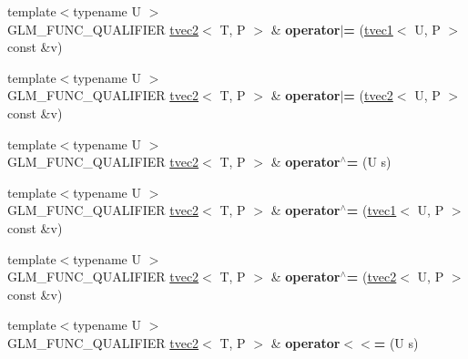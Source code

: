 \begin{DoxyCompactItemize}
\item 
\hypertarget{structglm_1_1tvec2_a843e403f0c04d10bcbe3a7ffe63454b9}{{\footnotesize template$<$typename U $>$ }\\G\-L\-M\-\_\-\-F\-U\-N\-C\-\_\-\-Q\-U\-A\-L\-I\-F\-I\-E\-R \hyperlink{structglm_1_1tvec2}{tvec2}$<$ T, P $>$ \& {\bfseries operator$\vert$=} (\hyperlink{structglm_1_1tvec1}{tvec1}$<$ U, P $>$ const \&v)}\label{structglm_1_1tvec2_a843e403f0c04d10bcbe3a7ffe63454b9}

\item 
\hypertarget{structglm_1_1tvec2_aa36fb52ee5d9c58525c1e82edfdadc70}{{\footnotesize template$<$typename U $>$ }\\G\-L\-M\-\_\-\-F\-U\-N\-C\-\_\-\-Q\-U\-A\-L\-I\-F\-I\-E\-R \hyperlink{structglm_1_1tvec2}{tvec2}$<$ T, P $>$ \& {\bfseries operator$\vert$=} (\hyperlink{structglm_1_1tvec2}{tvec2}$<$ U, P $>$ const \&v)}\label{structglm_1_1tvec2_aa36fb52ee5d9c58525c1e82edfdadc70}

\item 
\hypertarget{structglm_1_1tvec2_a6a53655906a5df2270509995a59acdf7}{{\footnotesize template$<$typename U $>$ }\\G\-L\-M\-\_\-\-F\-U\-N\-C\-\_\-\-Q\-U\-A\-L\-I\-F\-I\-E\-R \hyperlink{structglm_1_1tvec2}{tvec2}$<$ T, P $>$ \& {\bfseries operator$^\wedge$=} (U s)}\label{structglm_1_1tvec2_a6a53655906a5df2270509995a59acdf7}

\item 
\hypertarget{structglm_1_1tvec2_a2b88448c05b92b3a1f32b19f0698a53a}{{\footnotesize template$<$typename U $>$ }\\G\-L\-M\-\_\-\-F\-U\-N\-C\-\_\-\-Q\-U\-A\-L\-I\-F\-I\-E\-R \hyperlink{structglm_1_1tvec2}{tvec2}$<$ T, P $>$ \& {\bfseries operator$^\wedge$=} (\hyperlink{structglm_1_1tvec1}{tvec1}$<$ U, P $>$ const \&v)}\label{structglm_1_1tvec2_a2b88448c05b92b3a1f32b19f0698a53a}

\item 
\hypertarget{structglm_1_1tvec2_a97ae34925859e7738cf400ecc4880190}{{\footnotesize template$<$typename U $>$ }\\G\-L\-M\-\_\-\-F\-U\-N\-C\-\_\-\-Q\-U\-A\-L\-I\-F\-I\-E\-R \hyperlink{structglm_1_1tvec2}{tvec2}$<$ T, P $>$ \& {\bfseries operator$^\wedge$=} (\hyperlink{structglm_1_1tvec2}{tvec2}$<$ U, P $>$ const \&v)}\label{structglm_1_1tvec2_a97ae34925859e7738cf400ecc4880190}

\item 
\hypertarget{structglm_1_1tvec2_a2136cd307f81010a3745504ad8ff60a5}{{\footnotesize template$<$typename U $>$ }\\G\-L\-M\-\_\-\-F\-U\-N\-C\-\_\-\-Q\-U\-A\-L\-I\-F\-I\-E\-R \hyperlink{structglm_1_1tvec2}{tvec2}$<$ T, P $>$ \& {\bfseries operator$<$$<$=} (U s)}\label{structglm_1_1tvec2_a2136cd307f81010a3745504ad8ff60a5}


\end{DoxyCompactItemize}
